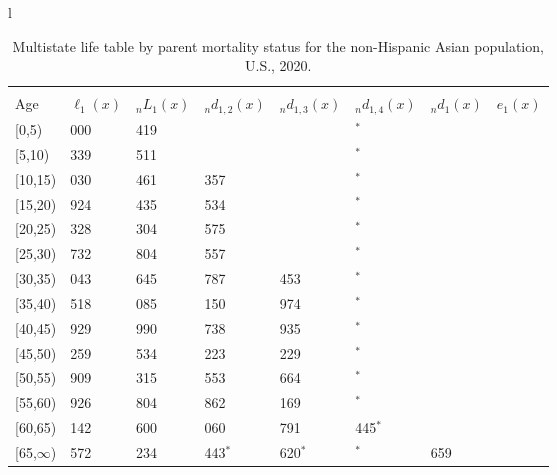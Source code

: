 \documentclass[
]{article}
\begin{document}
\begin{table}
\caption{\label{tab:table-nhasian}Multistate life table by parent mortality status for the non-Hispanic Asian population, U.S., 2020.}

\centering
\fontsize{9}{11}\selectfont
\begin{tabular}[t]{l}
\hline
\begin{tabular}{>{\raggedright\arraybackslash}p{.45in}>{\raggedleft\arraybackslash}p{.65in}>{\raggedleft\arraybackslash}p{.65in}>{\raggedleft\arraybackslash}p{.65in}>{\raggedleft\arraybackslash}p{.65in}>{\raggedleft\arraybackslash}p{.65in}>{\raggedleft\arraybackslash}p{.65in}>{\raggedleft\arraybackslash}p{.65in}}
\toprule
\multicolumn{1}{c}{ } & \multicolumn{7}{c}{(1) Lost neither} \\
\cmidrule(l{3pt}r{3pt}){2-8}
Age & $\ell_{1}(x)$ & ${}_nL_{1}(x)$ & ${}_nd_{1,2}(x)$ & ${}_nd_{1,3}(x)$ & ${}_nd_{1,4}(x)$ & ${}_nd_{1}(x)$ & $e_{1}(x)$\\
\midrule
{}[0,5) & 100 000 & 496 419 & 818 & 452 & 31$^{*}$ & 361 & 45\\
{}[5,10) & 98 339 & 488 511 & 870 & 408 & 0$^{*}$ & 31 & 40\\
{}[10,15) & 97 030 & 479 461 & 1 357 & 703 & 0$^{*}$ & 45 & 35\\
{}[15,20) & 94 924 & 466 435 & 1 534 & 913 & 0$^{*}$ & 150 & 30\\
{}[20,25) & 92 328 & 448 304 & 2 575 & 679 & 103$^{*}$ & 239 & 25\\
\addlinespace
{}[25,30) & 88 732 & 423 804 & 3 557 & 816 & 106$^{*}$ & 211 & 21\\
{}[30,35) & 84 043 & 392 645 & 3 787 & 1 453 & 66$^{*}$ & 220 & 17\\
{}[35,40) & 78 518 & 351 085 & 4 150 & 1 974 & 216$^{*}$ & 249 & 13\\
{}[40,45) & 71 929 & 296 990 & 4 738 & 2 935 & 705$^{*}$ & 292 & 9\\
{}[45,50) & 63 259 & 232 534 & 8 223 & 2 229 & 530$^{*}$ & 368 & 6\\
\addlinespace
{}[50,55) & 51 909 & 167 315 & 5 553 & 2 664 & 340$^{*}$ & 426 & 4\\
{}[55,60) & 42 926 & 107 804 & 6 862 & 3 169 & 346$^{*}$ & 407 & 2\\
{}[60,65) & 32 142 & 45 600 & 4 060 & 2 791 & 1 445$^{*}$ & 274 & 1\\
{}[65,$\infty$) & 23 572 & 58 234 & 4 443$^{*}$ & 2 620$^{*}$ & 711$^{*}$ & 2 659 & 1\\
\end{tabular}\\

\end{tabular}
\end{table}
\end{document}
